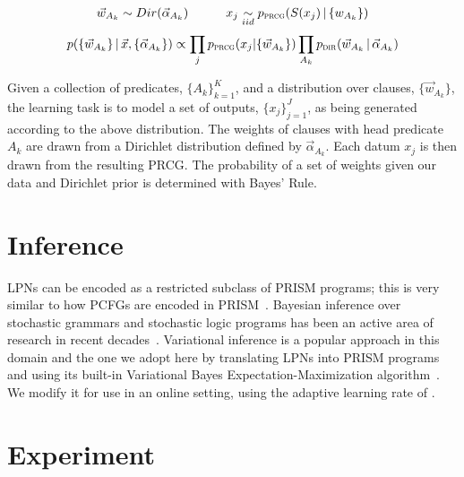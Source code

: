 \documentclass{article} %
\begin{document}
\[ \vec{w}_{A_k} \sim Dir(\vec{\alpha}_{A_k})\hspace{3em}
   x_j \underset{iid}{\sim} p_{\text{\textsc{prcg}}}(S(x_j)\,|\,\{w_{A_k}\}) \]
\[  p(\{\vec{w}_{A_k}\}\,|\, \vec{x}, \{\vec{\alpha}_{A_k}\}) \propto
  \prod_j p_{\text{\textsc{prcg}}}(x_j|\{\vec{w}_{A_k}\}) \prod_{A_k}
  p_{\text{\textsc{dir}}}(\vec{w}_{A_k}\,|\,\vec{\alpha}_{A_k}) \]

  \vspace{-1em}
Given a collection of predicates, $\{A_k\}_{k=1}^{K}$, and a
distribution over clauses, $\{\vec{w}_{A_k}\}$, the learning task is
to model a set of outputs, $\{x_j\}_{j=1}^{J}$, as being generated
according to the above distribution. The weights of clauses
with head predicate $A_k$ are drawn from a Dirichlet distribution
defined by $\vec{\alpha}_{A_k}$. Each datum $x_j$ is then drawn
from the resulting PRCG. The probability of a set of weights given our data and Dirichlet prior is determined with Bayes' Rule.

\section{Inference \label{sec:implementation}}

LPNs can be encoded as a restricted subclass of PRISM programs; this
is very similar to how PCFGs are encoded in
PRISM~\cite{DBLP:conf/cl/2000}. Bayesian inference over stochastic
grammars and stochastic logic programs has been an active area of
research in recent decades~\cite{DBLP:journals/etai/Muggleton00,
  cussens2001parameter, DBLP:conf/emnlp/LiangPJK07,
  goldwater2006contextual, johnson2006adaptor}.  Variational inference
is a popular approach in this domain and the one we adopt here by
translating LPNs into PRISM programs and using its built-in
Variational Bayes Expectation-Maximization
algorithm~\cite{sato2008variational}. We modify it for use in an
online setting, using the adaptive learning rate of
\cite{ranganath2013adaptive}.

\section{Experiment}
\end{document}
